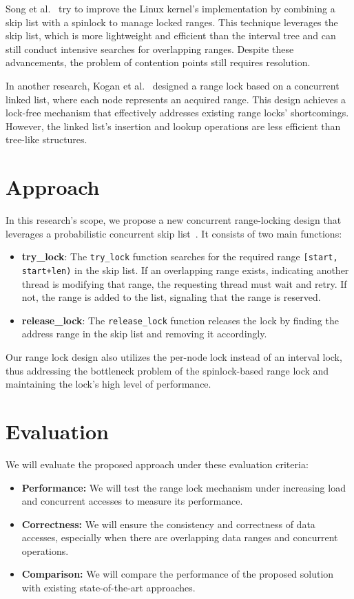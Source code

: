 Song et al.~\parencite{song2013parallelizing} try to improve the Linux kernel's implementation by combining a skip list with a spinlock to manage locked ranges. This technique leverages the skip list, which is more lightweight and efficient than the interval tree and can still conduct intensive searches for overlapping ranges. Despite these advancements, the problem of contention points still requires resolution.

In another research, Kogan et al.~\cite{kogan2020scalable} designed a range lock based on a concurrent linked list, where each node represents an acquired range. This design achieves a lock-free mechanism that effectively addresses existing range locks' shortcomings. However, the linked list's insertion and lookup operations are less efficient than tree-like structures.

\section{Approach}
In this research's scope, we propose a new concurrent range-locking design that leverages a probabilistic concurrent skip list~\parencite{herlihy2006provably, herlihy2020art}. It consists of two main functions:
\begin{itemize}
    \item \textbf{try\_lock}: The \texttt{try\_lock} function searches for the required range \texttt{[start, start+len)} in the skip list. If an overlapping range exists, indicating another thread is modifying that range, the requesting thread must wait and retry. If not, the range is added to the list, signaling that the range is reserved.
    \item \textbf{release\_lock}: The \texttt{release\_lock} function releases the lock by finding the address range in the skip list and removing it accordingly.
\end{itemize} 

Our range lock design also utilizes the per-node lock instead of an interval lock, thus addressing the bottleneck problem of the spinlock-based range lock and maintaining the lock's high level of performance. 

\section{Evaluation}
We will evaluate the proposed approach under these evaluation criteria:
\begin{itemize}
    \item \textbf{Performance:} We will test the range lock mechanism under increasing load and concurrent accesses to measure its performance.
    \item \textbf{Correctness:} We will ensure the consistency and correctness of data accesses, especially when there are overlapping data ranges and concurrent operations.
    \item \textbf{Comparison:} We will compare the performance of the proposed solution with existing state-of-the-art approaches.
\end{itemize}

